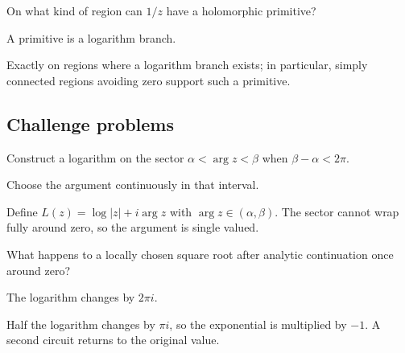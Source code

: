 \begin{exercise}\label{exr:iv14-expand-14}
On what kind of region can \(1/z\) have a holomorphic primitive?
\end{exercise}
\begin{hint}
A primitive is a logarithm branch.
\end{hint}
\begin{solution}
Exactly on regions where a logarithm branch exists; in particular, simply connected regions avoiding zero support such a primitive.
\end{solution}

\subsection*{Challenge problems}

\begin{exercise}\label{exr:iv14-expand-15}
Construct a logarithm on the sector \(\alpha<\arg z<\beta\) when \(\beta-\alpha<2\pi\).
\end{exercise}
\begin{hint}
Choose the argument continuously in that interval.
\end{hint}
\begin{solution}
Define \(L(z)=\log|z|+i\arg z\) with \(\arg z\in(\alpha,\beta)\). The sector cannot wrap fully around zero, so the argument is single valued.
\end{solution}

\begin{exercise}\label{exr:iv14-expand-16}
What happens to a locally chosen square root after analytic continuation once around zero?
\end{exercise}
\begin{hint}
The logarithm changes by \(2\pi i\).
\end{hint}
\begin{solution}
Half the logarithm changes by \(\pi i\), so the exponential is multiplied by \(-1\). A second circuit returns to the original value.
\end{solution}


